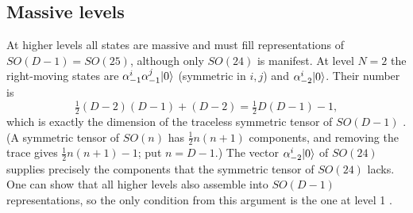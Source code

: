 \subsection{Massive levels}

At higher levels all states are massive and must fill representations of $SO(D-1)=SO(25)$,
although only $SO(24)$ is manifest. At level $N=2$ the right-moving states are
$\alpha^i_{-1}\alpha^j_{-1}|0\rangle$ (symmetric in $i,j$) and $\alpha^i_{-2}|0\rangle$. Their number is
\begin{equation}\label{eq:quantum:level2}
 \tfrac12(D-2)(D-1)+(D-2)=\tfrac12D(D-1)-1 ,
\end{equation}
which is exactly the dimension of the traceless symmetric tensor of $SO(D-1)$
. (A symmetric tensor of $SO(n)$ has $\frac12n(n+1)$
components, and removing the trace gives $\frac12n(n+1)-1$; put $n=D-1$.) The vector
$\alpha^i_{-2}|0\rangle$ of $SO(24)$ supplies precisely the components that the symmetric tensor of
$SO(24)$ lacks. One can show that all higher levels also assemble into $SO(D-1)$
representations, so the only condition from this argument is the one at level 1
.

